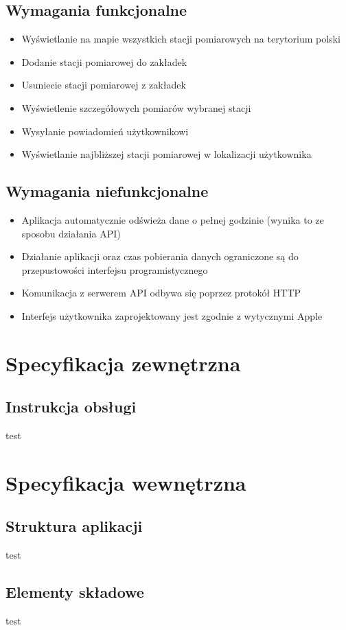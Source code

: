 \documentclass[a4paper,11pt,titlepage]{article}
\begin{document}
\subsection{Wymagania funkcjonalne}
\begin{itemize}
 	\item Wyświetlanie na mapie wszystkich stacji pomiarowych na terytorium polski
  	\item Dodanie stacji pomiarowej do zakładek
  	\item Usuniecie stacji pomiarowej z zakładek
	\item Wyświetlenie szczegółowych pomiarów wybranej stacji
	\item Wysyłanie powiadomień użytkownikowi
	\item Wyświetlanie najbliższej stacji pomiarowej w lokalizacji użytkownika
\end{itemize}
\subsection{Wymagania niefunkcjonalne}
\begin{itemize}
 	\item Aplikacja automatycznie odświeża dane o pełnej godzinie (wynika to ze sposobu działania API)
	\item Działanie aplikacji oraz czas pobierania danych ograniczone są do przepustowości interfejsu programistycznego
	\item Komunikacja z serwerem API odbywa się poprzez protokół HTTP
	\item Interfejs użytkownika zaprojektowany jest zgodnie z wytycznymi Apple
\end{itemize}

\section{Specyfikacja zewnętrzna}
\subsection{Instrukcja obsługi}
test


\section{Specyfikacja wewnętrzna}
\subsection{Struktura aplikacji}
test
\subsection{Elementy składowe}
test
\end{document}
